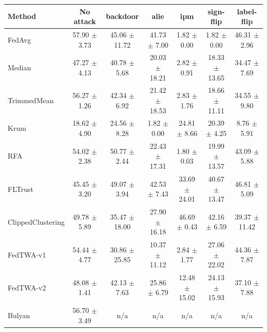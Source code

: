 \begin{tabular}{lcccccc}
\toprule
Method & No attack & backdoor & alie & ipm & sign-flip & label-flip \\
\midrule
FedAvg & 57.90 $\pm$ 3.73 & 45.06 $\pm$ 11.72 & 41.73 $\pm$ 7.00 & 1.82 $\pm$ 0.00 & 1.82 $\pm$ 0.00 & 46.31 $\pm$ 2.96 \\
Median & 47.27 $\pm$ 4.13 & 40.78 $\pm$ 5.68 & 20.03 $\pm$ 18.21 & 2.82 $\pm$ 0.91 & 18.33 $\pm$ 13.65 & 34.47 $\pm$ 7.69 \\
TrimmedMean & 56.27 $\pm$ 1.26 & 42.34 $\pm$ 6.92 & 21.42 $\pm$ 18.53 & 2.83 $\pm$ 1.76 & 18.66 $\pm$ 11.11 & 34.55 $\pm$ 9.80 \\
Krum & 18.62 $\pm$ 4.90 & 24.56 $\pm$ 8.28 & 1.82 $\pm$ 0.00 & 24.81 $\pm$ 8.66 & 20.39 $\pm$ 4.25 & 8.76 $\pm$ 5.91 \\
RFA & 54.02 $\pm$ 2.38 & 50.77 $\pm$ 2.44 & 22.43 $\pm$ 17.31 & 1.80 $\pm$ 0.03 & 19.99 $\pm$ 13.57 & 43.09 $\pm$ 5.88 \\
FLTrust & 45.45 $\pm$ 3.20 & 49.07 $\pm$ 3.94 & 42.53 $\pm$ 7.43 & 33.69 $\pm$ 24.01 & 40.67 $\pm$ 13.47 & 46.81 $\pm$ 5.09 \\
ClippedClustering & 49.78 $\pm$ 5.89 & 35.47 $\pm$ 18.00 & 27.90 $\pm$ 16.18 & 46.69 $\pm$ 0.43 & 42.16 $\pm$ 6.59 & 39.37 $\pm$ 11.42 \\
FedTWA-v1 & 54.44 $\pm$ 4.77 & 30.86 $\pm$ 25.85 & 10.37 $\pm$ 11.12 & 2.84 $\pm$ 1.77 & 27.06 $\pm$ 22.02 & 44.36 $\pm$ 7.87 \\
FedTWA-v2 & 48.08 $\pm$ 1.41 & 42.13 $\pm$ 7.63 & 25.86 $\pm$ 6.79 & 12.48 $\pm$ 15.02 & 24.13 $\pm$ 15.93 & 37.10 $\pm$ 7.88 \\
Bulyan & 56.70 $\pm$ 3.49 & n/a & n/a & n/a & n/a & n/a \\
\bottomrule
\end{tabular}